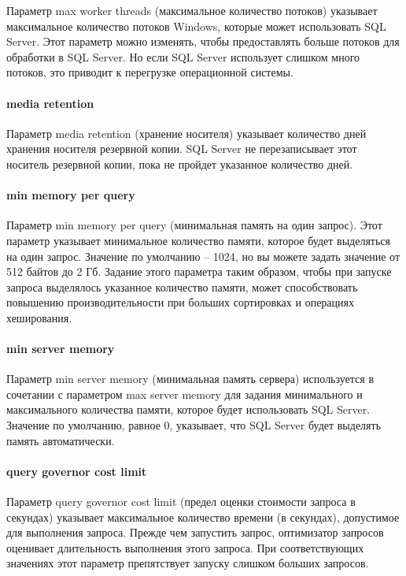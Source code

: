 \documentclass[russian,utf8,emptystyle]{eskdtext}
\begin{document}
Параметр max worker threads (максимальное количество потоков) указывает максимальное количество потоков Windows, которые может использовать SQL Server. Этот параметр можно изменять, чтобы предоставлять больше потоков для обработки в SQL Server. Но если SQL Server использует слишком много потоков, это приводит к перегрузке операционной системы.

\paragraph{media retention}

Параметр media retention (хранение носителя) указывает количество дней хранения носителя резервной копии. SQL Server не перезаписывает этот носитель резервной копии, пока не пройдет указанное количество дней.

\paragraph{min memory per query}

Параметр min memory per query (минимальная память на один запрос). Этот параметр указывает минимальное количество памяти, которое будет выделяться на один запрос. Значение по умолчанию – 1024, но вы можете задать значение от 512 байтов до 2 Гб. Задание этого параметра таким образом, чтобы при запуске запроса выделялось указанное количество памяти, может способствовать повышению производительности при больших сортировках и операциях хеширования.

\paragraph{min server memory}

Параметр min server memory (минимальная память сервера) используется в сочетании с параметром max server memory для задания минимального и максимального количества памяти, которое будет использовать SQL Server. Значение по умолчанию, равное 0, указывает, что SQL Server будет выделять память автоматически.

\paragraph{query governor cost limit}

Параметр query governor cost limit (предел оценки стоимости запроса в секундах) указывает максимальное количество времени (в секундах), допустимое для выполнения запроса. Прежде чем запустить запрос, оптимизатор запросов оценивает длительность выполнения этого запроса. При соответствующих значениях этот параметр препятствует запуску слишком больших запросов.
\end{document}
